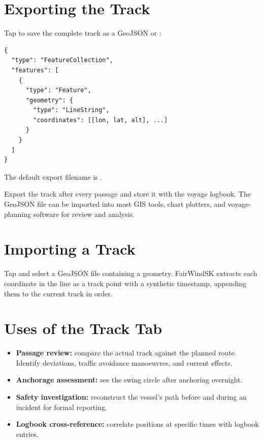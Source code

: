 \section{Exporting the Track}

Tap  to save the complete track as a GeoJSON  or
:

\begin{lstlisting}
{
  "type": "FeatureCollection",
  "features": [
    {
      "type": "Feature",
      "geometry": {
        "type": "LineString",
        "coordinates": [[lon, lat, alt], ...]
      }
    }
  ]
}
\end{lstlisting}

The default export filename is .

\begin{tipbox}
Export the track after every passage and store it with the voyage logbook.
The GeoJSON file can be imported into most GIS tools, chart plotters, and voyage-planning software
for review and analysis.
\end{tipbox}

\section{Importing a Track}

Tap  and select a GeoJSON file containing a  geometry.
FairWindSK extracts each coordinate in the line as a track point with a synthetic timestamp,
appending them to the current track in order.

\section{Uses of the Track Tab}

\begin{itemize}
  \item \textbf{Passage review:} compare the actual track against the planned route. Identify deviations, traffic avoidance manoeuvres, and current effects.
  \item \textbf{Anchorage assessment:} see the swing circle after anchoring overnight.
  \item \textbf{Safety investigation:} reconstruct the vessel's path before and during an incident for formal reporting.
  \item \textbf{Logbook cross-reference:} correlate positions at specific times with logbook entries.
\end{itemize}

